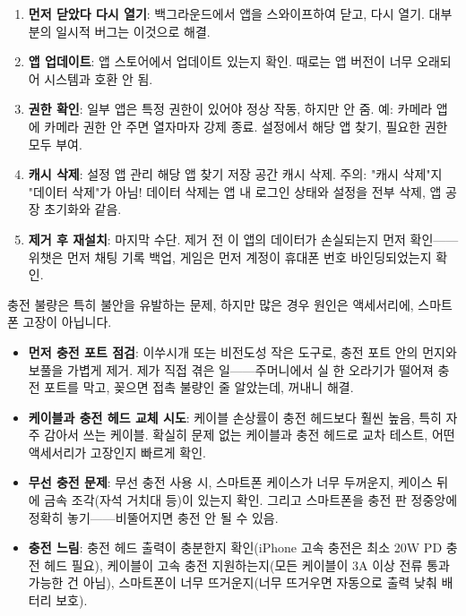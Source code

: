 \begin{enumerate}
  \item \textbf{먼저 닫았다 다시 열기}: 백그라운드에서 앱을 스와이프하여 닫고, 다시 열기. 대부분의 일시적 버그는 이것으로 해결.
  \item \textbf{앱 업데이트}: 앱 스토어에서 업데이트 있는지 확인. 때로는 앱 버전이 너무 오래되어 시스템과 호환 안 됨.
  \item \textbf{권한 확인}: 일부 앱은 특정 권한이 있어야 정상 작동, 하지만 안 줌. 예: 카메라 앱에 카메라 권한 안 주면 열자마자 강제 종료. 설정에서 해당 앱 찾기, 필요한 권한 모두 부여.
  \item \textbf{캐시 삭제}: 설정 앱 관리 해당 앱 찾기 저장 공간 캐시 삭제. 주의: "캐시 삭제"지 "데이터 삭제"가 아님! 데이터 삭제는 앱 내 로그인 상태와 설정을 전부 삭제, 앱 공장 초기화와 같음.
  \item \textbf{제거 후 재설치}: 마지막 수단. 제거 전 이 앱의 데이터가 손실되는지 먼저 확인——위챗은 먼저 채팅 기록 백업, 게임은 먼저 계정이 휴대폰 번호 바인딩되었는지 확인.
\end{enumerate}


충전 불량은 특히 불안을 유발하는 문제, 하지만 많은 경우 원인은 액세서리에, 스마트폰 고장이 아닙니다.

\begin{itemize}
  \item \textbf{먼저 충전 포트 점검}: 이쑤시개 또는 비전도성 작은 도구로, 충전 포트 안의 먼지와 보풀을 가볍게 제거. 제가 직접 겪은 일——주머니에서 실 한 오라기가 떨어져 충전 포트를 막고, 꽂으면 접촉 불량인 줄 알았는데, 꺼내니 해결.
  \item \textbf{케이블과 충전 헤드 교체 시도}: 케이블 손상률이 충전 헤드보다 훨씬 높음, 특히 자주 감아서 쓰는 케이블. 확실히 문제 없는 케이블과 충전 헤드로 교차 테스트, 어떤 액세서리가 고장인지 빠르게 확인.
  \item \textbf{무선 충전 문제}: 무선 충전 사용 시, 스마트폰 케이스가 너무 두꺼운지, 케이스 뒤에 금속 조각(자석 거치대 등)이 있는지 확인. 그리고 스마트폰을 충전 판 정중앙에 정확히 놓기——비뚤어지면 충전 안 될 수 있음.
  \item \textbf{충전 느림}: 충전 헤드 출력이 충분한지 확인(iPhone 고속 충전은 최소 20W PD 충전 헤드 필요), 케이블이 고속 충전 지원하는지(모든 케이블이 3A 이상 전류 통과 가능한 건 아님), 스마트폰이 너무 뜨거운지(너무 뜨거우면 자동으로 출력 낮춰 배터리 보호).
\end{itemize}

